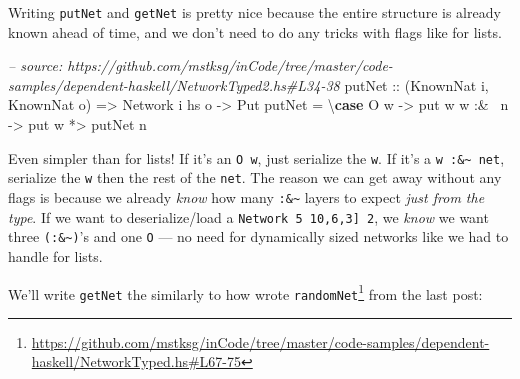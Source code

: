 \documentclass[]{article}
\newenvironment{Shaded}{}{}
\newcommand{\KeywordTok}[1]{\textcolor[rgb]{0.00,0.44,0.13}{\textbf{{#1}}}}
\newcommand{\DataTypeTok}[1]{\textcolor[rgb]{0.56,0.13,0.00}{{#1}}}
\newcommand{\CommentTok}[1]{\textcolor[rgb]{0.38,0.63,0.69}{\textit{{#1}}}}
\newcommand{\OtherTok}[1]{\textcolor[rgb]{0.00,0.44,0.13}{{#1}}}
\newcommand{\FunctionTok}[1]{\textcolor[rgb]{0.02,0.16,0.49}{{#1}}}
\newcommand{\NormalTok}[1]{{#1}}
\renewcommand{\href}[2]{#2\footnote{\url{#1}}}
\begin{document}
Writing \texttt{putNet} and \texttt{getNet} is pretty nice because the entire
structure is already known ahead of time, and we don't need to do any tricks
with flags like for lists.

\begin{Shaded}
\begin{Highlighting}[]
\CommentTok{-- source: https://github.com/mstksg/inCode/tree/master/code-samples/dependent-haskell/NetworkTyped2.hs#L34-38}
\OtherTok{putNet ::} \NormalTok{(}\DataTypeTok{KnownNat} \NormalTok{i, }\DataTypeTok{KnownNat} \NormalTok{o)}
       \OtherTok{=>} \DataTypeTok{Network} \NormalTok{i hs o}
       \OtherTok{->} \DataTypeTok{Put}
\NormalTok{putNet }\FunctionTok{=} \NormalTok{\textbackslash{}}\KeywordTok{case} \DataTypeTok{O} \NormalTok{w     }\OtherTok{->} \NormalTok{put w}
               \NormalTok{w }\FunctionTok{:&~} \NormalTok{n }\OtherTok{->} \NormalTok{put w }\FunctionTok{*>} \NormalTok{putNet n}
\end{Highlighting}
\end{Shaded}

Even simpler than for lists! If it's an \texttt{O\ w}, just serialize the
\texttt{w}. If it's a \texttt{w\ :\&\textasciitilde{}\ net}, serialize the
\texttt{w} then the rest of the \texttt{net}. The reason we can get away without
any flags is because we already \emph{know} how many
\texttt{:\&\textasciitilde{}} layers to expect \emph{just from the type}. If we
want to deserialize/load a
\texttt{Network\ 5\ \textquotesingle{}{[}10,6,3{]}\ 2}, we \emph{know} we want
three \texttt{(:\&\textasciitilde{})}'s and one \texttt{O} --- no need for
dynamically sized networks like we had to handle for lists.

We'll write \texttt{getNet} the similarly to how wrote
\href{https://github.com/mstksg/inCode/tree/master/code-samples/dependent-haskell/NetworkTyped.hs\#L67-75}{\texttt{randomNet}}
from the last post:

\begin{Shaded}
\end{Shaded}
\end{document}
